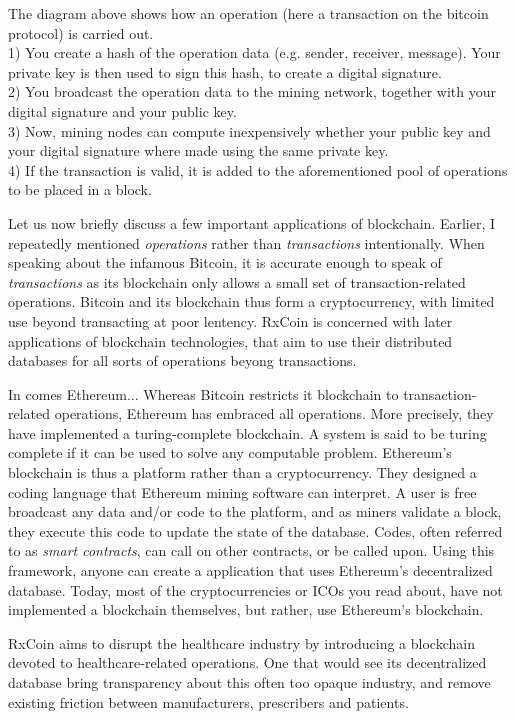 The diagram above shows how an operation (here a transaction on the bitcoin protocol) is carried out.\\
1) You create a hash of the operation data (e.g. sender, receiver, message). Your private key is then used to sign this hash,
to create a digital signature.\\
2) You broadcast the operation data to the mining network, together with your digital signature and your public key.\\
3) Now, mining nodes can compute inexpensively whether your public key and your digital signature where made using the same private key.\\
4) If the transaction is valid, it is added to the aforementioned pool of operations to be placed in a block.

Let us now briefly discuss a few important applications of blockchain.
Earlier, I repeatedly mentioned \emph{operations} rather than \emph{transactions} intentionally.
When speaking about the infamous Bitcoin, it is accurate enough to speak of \emph{transactions} as its blockchain
only allows a small set of transaction-related operations.
Bitcoin and its blockchain thus form a cryptocurrency, with limited use beyond transacting at poor lentency.
RxCoin is concerned with later applications of blockchain technologies,
that aim to use their distributed databases for all sorts of operations beyong transactions.

In comes Ethereum...
Whereas Bitcoin restricts it blockchain to transaction-related operations, Ethereum has embraced all operations.
More precisely, they have implemented a turing-complete blockchain.
A system is said to be turing complete if it can be used to solve any computable problem.
Ethereum's blockchain is thus a platform rather than a cryptocurrency.
They designed a coding language that Ethereum mining software can interpret. 
A user is free broadcast any data and/or code to the platform, and as miners validate a block,
they execute this code to update the state of the database.
Codes, often referred to as \emph{smart contracts}, can call on other contracts, or be called upon.
Using this framework, anyone can create a application that uses Ethereum's decentralized database.
Today, most of the cryptocurrencies or ICOs you read about, have not implemented a blockchain themselves,
but rather, use Ethereum's blockchain.

RxCoin aims to disrupt the healthcare industry by introducing a blockchain devoted to healthcare-related operations.
One that would see its decentralized database bring transparency about this often too opaque industry,
and remove existing friction between manufacturers, prescribers and patients. 


